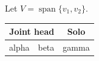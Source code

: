 \documentclass{article}
\renewcommand{\span}{\operatorname{span}}
\begin{document}
Let $V=\span\{v_1,v_2\}$.
\begin{tabular}{|c|c|c|}
\hline
\multicolumn{2}{|c|}{Joint head} & Solo \\
\hline
alpha & beta & gamma \\
\hline
\end{tabular}
\end{document}
